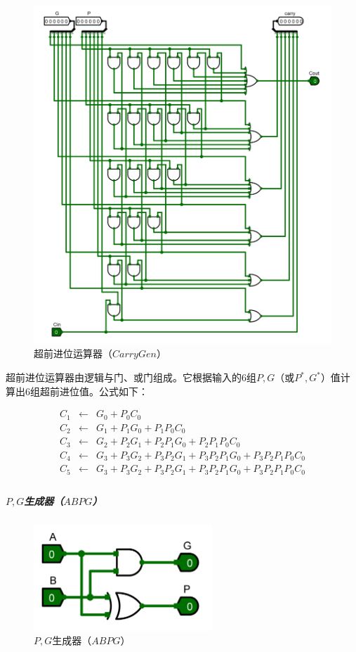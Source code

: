 \documentclass[main.tex]{subfiles}
\begin{document}
\begin{figure}[H]
\centering
\includegraphics[width=\textwidth]{images/CarryGen-circuit.png}
\caption{超前进位运算器（$CarryGen$）}
\end{figure}

超前进位运算器由逻辑与门、或门组成。它根据输入的6组$P, G$（或$P^*, G^*$）值计算出6组超前进位值。公式如下：

$$
\begin{array}{rcl}
C_1 &\leftarrow& G_0+P_0C_0 \\
C_2 &\leftarrow& G_1+P_1G_0+P_1P_0C_0 \\
C_3 &\leftarrow& G_2+P_2G_1+P_2P_1G_0+P_2P_1P_0C_0 \\
C_4 &\leftarrow& G_3+P_3G_2+P_3P_2G_1+P_3P_2P_1G_0+P_3P_2P_1P_0C_0 \\
C_5 &\leftarrow& G_3+P_3G_2+P_3P_2G_1+P_3P_2P_1G_0+P_3P_2P_1P_0C_0 \\
\end{array}
$$




\subparagraph{$P, G$生成器（$ABPG$）}

\begin{figure}[H]
\centering
\includegraphics[width=0.6\textwidth]{images/ABGP-circuit.png}
\caption{$P, G$生成器（$ABPG$）}
\end{figure}
\end{document}
